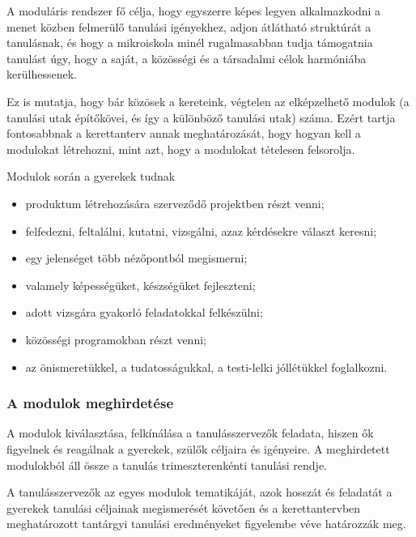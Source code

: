A moduláris rendszer fő célja, hogy egyszerre képes legyen alkalmazkodni a menet közben felmerülő tanulási igényekhez, adjon átlátható struktúrát a tanulásnak, és hogy a mikroiskola minél rugalmasabban tudja támogatni\break a tanulást úgy, hogy a saját, a közösségi és a társadalmi célok harmóniába kerülhessenek.

Ez is mutatja, hogy bár közösek a kereteink, végtelen az elképzelhető modulok (a tanulási utak építőkövei, és így a különböző tanulási utak) száma. Ezért tartja fontosabbnak a kerettanterv annak meghatározását, hogy hogyan kell a modulokat létrehozni, mint azt, hogy a modulokat tételesen felsorolja.

Modulok során a gyerekek tudnak

\begin{itemize}
      \item produktum létrehozására szerveződő projektben részt venni;

      \item felfedezni, feltalálni, kutatni, vizsgálni, azaz kérdésekre választ keresni;

      \item egy jelenséget több nézőpontból megismerni;

      \item valamely képességüket, készségüket fejleszteni;

      \item adott vizsgára gyakorló feladatokkal felkészülni;

      \item közösségi programokban részt venni;

      \item az önismeretükkel, a tudatosságukkal, a testi-lelki jóllétükkel fog\-lal\-kozni.
\end{itemize}

\subsubsection{A modulok meghirdetése}
\label{sec:modulok_meghirdetese}
A modulok kiválasztása, felkínálása a tanulásszervezők feladata, hiszen ők figyelnek és reagálnak a gyerekek, szülők céljaira és igényeire. A meghirdetett modulokból áll össze a tanulás trimeszterenkénti tanulási rendje.

A tanulásszervezők az egyes modulok tematikáját, azok hosszát és feladatát a gyerekek tanulási céljainak megismerését követően és a kerettantervben meghatározott tantárgyi tanulási eredményeket figyelembe véve határozzák meg.

